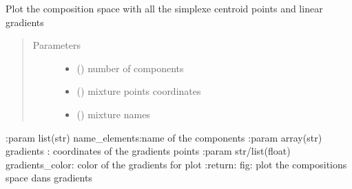 \documentclass[letterpaper,10pt,english]{sphinxmanual}
\begin{document}
\begin{fulllineitems}
\label{\detokenize{ExperimentsPlannification:modules.plot_compo_space_gradients}}
\sphinxAtStartPar
Plot the composition space with all the simplexe centroid points and linear gradients
\begin{quote}\begin{description}
\item[{Parameters}] \leavevmode\begin{itemize}
\item {} 
\sphinxAtStartPar
{} () \textendash{} number of components

\item {} 
\sphinxAtStartPar
{} () \textendash{} mixture points coordinates

\item {} 
\sphinxAtStartPar
{} () \textendash{} mixture names

\end{itemize}

\end{description}\end{quote}

\sphinxAtStartPar
:param list(str) name\_elements:name of the components
:param array(str) gradients : coordinates of the gradients points
:param str/list(float) gradients\_color: color of the gradients for plot
:return: fig: plot the compositions space dans gradients

\end{fulllineitems}

\label{\detokenize{ExperimentsPlannification:module-modules}}
\end{document}
